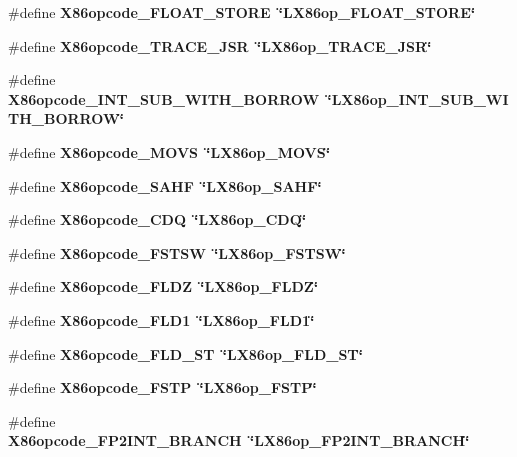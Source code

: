 \begin{CompactItemize}
\#define \bf{X86opcode\_\-FLOAT\_\-STORE}~\char`\"{}LX86op\_\-FLOAT\_\-STORE\char`\"{}
\item 
\#define \bf{X86opcode\_\-TRACE\_\-JSR}~\char`\"{}LX86op\_\-TRACE\_\-JSR\char`\"{}
\item 
\#define \bf{X86opcode\_\-INT\_\-SUB\_\-WITH\_\-BORROW}~\char`\"{}LX86op\_\-INT\_\-SUB\_\-WITH\_\-BORROW\char`\"{}
\item 
\#define \bf{X86opcode\_\-MOVS}~\char`\"{}LX86op\_\-MOVS\char`\"{}
\item 
\#define \bf{X86opcode\_\-SAHF}~\char`\"{}LX86op\_\-SAHF\char`\"{}
\item 
\#define \bf{X86opcode\_\-CDQ}~\char`\"{}LX86op\_\-CDQ\char`\"{}
\item 
\#define \bf{X86opcode\_\-FSTSW}~\char`\"{}LX86op\_\-FSTSW\char`\"{}
\item 
\#define \bf{X86opcode\_\-FLDZ}~\char`\"{}LX86op\_\-FLDZ\char`\"{}
\item 
\#define \bf{X86opcode\_\-FLD1}~\char`\"{}LX86op\_\-FLD1\char`\"{}
\item 
\#define \bf{X86opcode\_\-FLD\_\-ST}~\char`\"{}LX86op\_\-FLD\_\-ST\char`\"{}
\item 
\#define \bf{X86opcode\_\-FSTP}~\char`\"{}LX86op\_\-FSTP\char`\"{}
\item 
\#define \bf{X86opcode\_\-FP2INT\_\-BRANCH}~\char`\"{}LX86op\_\-FP2INT\_\-BRANCH\char`\"{}
\end{CompactItemize}
